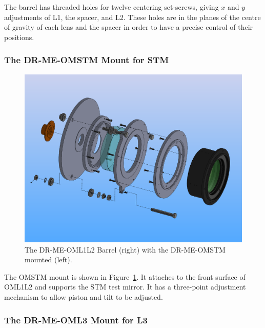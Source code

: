 \documentclass{article}
\begin{document}
The barrel has threaded holes for twelve centering set-screws, giving $x$ and $y$ adjustments of L1, the spacer, and L2. These holes are in the planes of the centre of gravity of each lens and the spacer in order to have a precise control of their positions.

\subsubsection{The DR-ME-OMSTM Mount for STM}

\begin{figure}
\begin{center}
\includegraphics[width=\linewidth]{figures/DR-ME-OMSTM-OML1L2-REN.PDF}
\end{center}
\caption{The DR-ME-OML1L2 Barrel (right) with the DR-ME-OMSTM mounted (left).}
\label{figure:alex-omstm}
\end{figure}

The OMSTM mount is shown in Figure~\ref{figure:alex-omstm}. It attaches to the front surface of OML1L2 and supports the STM test mirror. It has a three-point adjustment mechanism to allow piston and tilt to be adjusted.

\subsubsection{The DR-ME-OML3 Mount for L3}
\end{document}
